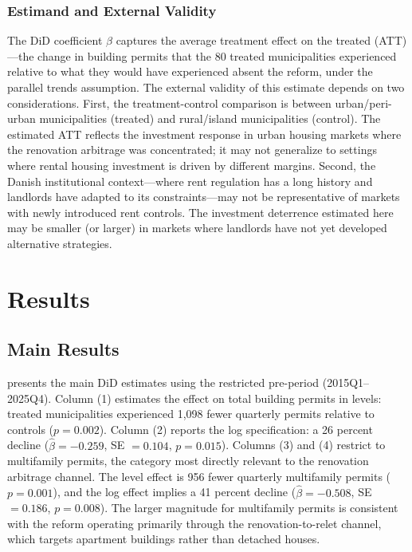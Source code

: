 \documentclass[12pt]{article}
\begin{document}
\subsubsection*{Estimand and External Validity} The DiD coefficient $\beta$ captures the average treatment effect on the treated (ATT)---the change in building permits that the 80 treated municipalities experienced relative to what they would have experienced absent the reform, under the parallel trends assumption. The external validity of this estimate depends on two considerations. First, the treatment-control comparison is between urban/peri-urban municipalities (treated) and rural/island municipalities (control). The estimated ATT reflects the investment response in urban housing markets where the renovation arbitrage was concentrated; it may not generalize to settings where rental housing investment is driven by different margins. Second, the Danish institutional context---where rent regulation has a long history and landlords have adapted to its constraints---may not be representative of markets with newly introduced rent controls. The investment deterrence estimated here may be smaller (or larger) in markets where landlords have not yet developed alternative strategies.

\section{Results}

\subsection{Main Results}



 presents the main DiD estimates using the restricted pre-period (2015Q1--2025Q4). Column (1) estimates the effect on total building permits in levels: treated municipalities experienced 1,098 fewer quarterly permits relative to controls ($p = 0.002$). Column (2) reports the log specification: a 26 percent decline ($\hat{\beta} = -0.259$, SE $= 0.104$, $p = 0.015$). Columns (3) and (4) restrict to multifamily permits, the category most directly relevant to the renovation arbitrage channel. The level effect is 956 fewer quarterly multifamily permits ($p = 0.001$), and the log effect implies a 41 percent decline ($\hat{\beta} = -0.508$, SE $= 0.186$, $p = 0.008$). The larger magnitude for multifamily permits is consistent with the reform operating primarily through the renovation-to-relet channel, which targets apartment buildings rather than detached houses.
\end{document}
